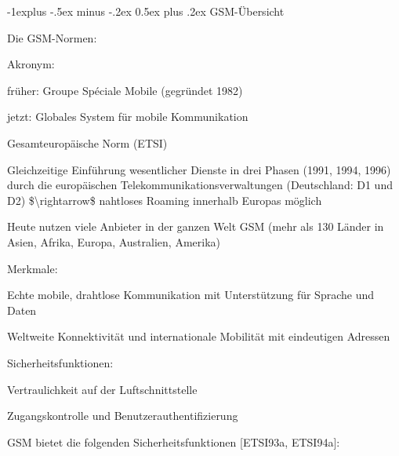 \documentclass[a4paper]{article}
\makeatletter
\renewcommand{\subsection}{\@startsection{subsection}{2}{0mm}%
 {-1explus -.5ex minus -.2ex}%
 {0.5ex plus .2ex}%
 {\normalfont\normalsize\bfseries}}
\makeatother
\begin{document}
\begin{multicols}{3}
      \subsection{GSM-Übersicht}
      \begin{itemize*}
            \item Die GSM-Normen:
            \begin{itemize*}
                  \item Akronym:
                  \begin{itemize*}
                        \item früher: Groupe Spéciale Mobile (gegründet 1982)
                        \item jetzt: Globales System für mobile Kommunikation
                  \end{itemize*}
                  \item Gesamteuropäische Norm (ETSI)
                  \item Gleichzeitige Einführung wesentlicher Dienste in drei Phasen (1991, 1994, 1996) durch die europäischen Telekommunikationsverwaltungen (Deutschland: D1 und D2) \$\textbackslash rightarrow\$ nahtloses Roaming innerhalb Europas möglich
                  \item Heute nutzen viele Anbieter in der ganzen Welt GSM (mehr als 130 Länder in Asien, Afrika, Europa, Australien, Amerika)
            \end{itemize*}
            \item Merkmale:
            \begin{itemize*}
                  \item Echte mobile, drahtlose Kommunikation mit Unterstützung für Sprache und Daten
                  \item Weltweite Konnektivität und internationale Mobilität mit eindeutigen Adressen
                  \item Sicherheitsfunktionen:
                  \begin{itemize*}
                        \item Vertraulichkeit auf der Luftschnittstelle
                        \item Zugangskontrolle und Benutzerauthentifizierung
                  \end{itemize*}
            \end{itemize*}
            \item GSM bietet die folgenden Sicherheitsfunktionen {[}ETSI93a, ETSI94a{]}:
            \begin{itemize*}

\end{itemize*}
\end{itemize*}
\end{multicols}
\end{document}
